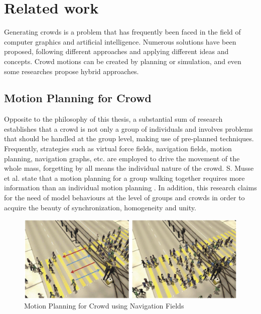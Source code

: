 \ifx\isEmbedded\undefined

\graphicspath{{../img/}}

\fi

\chapter{Related work}
\label{chap:related}

Generating crowds is a problem that has frequently been faced in the field of computer graphics and artificial intelligence. Numerous solutions have been proposed, following different approaches and applying different ideas and concepts. Crowd motions can be created by planning or simulation, and even some researches propose hybrid approaches.

\section{Motion Planning for Crowd}

Opposite to the philosophy of this thesis, a substantial sum of research establishes that a crowd is not only a group of individuals and involves problems that should be handled at the group level, making use of pre-planned techniques. Frequently, strategies such as virtual force fields, navigation fields, motion planning, navigation graphs, etc. are employed to drive the movement of the whole mass, forgetting by all means the individual nature of the crowd. S. Musse et al. state that a motion planning for a group walking together requires more information than an individual motion planning \citep{musse1}. In addition, this research claims for the need of model behaviours at the level of groups and crowds in order to acquire the beauty of synchronization, homogeneity and unity.

\begin{figure}[!htb]
  \centering
  \includegraphics[scale=0.4]{navigation_fields.eps}
  \caption{Motion Planning for Crowd using Navigation Fields \citep{patil}}
  \label{fig:navigation}
\end{figure}

